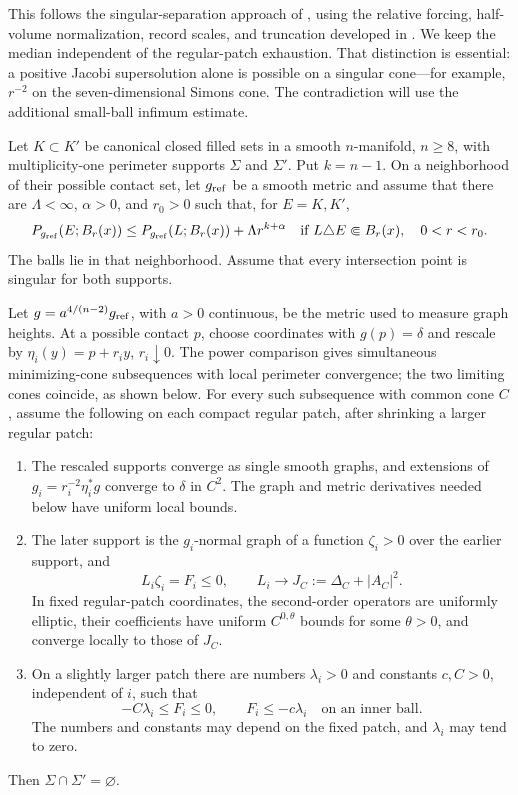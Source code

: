 This follows the singular-separation approach of
\cite[Proposition~2.36]{BiZhu2026}, using the relative forcing,
half-volume normalization, record scales, and truncation developed in
\cite[Proposition~2.34 and Lemma~2.35]{BiZhu2026v2}. We keep the
median independent of the regular-patch exhaustion. That distinction
is essential: a positive Jacobi supersolution alone is possible on a
singular cone---for example, $r^{-2}$ on the seven-dimensional Simons
cone. The contradiction will use the additional small-ball infimum
estimate.

\begin{proposition}
\label{prop:rpi:singular-separation}
Let $K\subset K'$ be canonical closed filled sets in a smooth
$n$-manifold, $n\ge8$, with multiplicity-one perimeter supports
$\Sigma$ and $\Sigma'$. Put $k=n-1$. On a neighborhood of their
possible contact set, let $g_{\rm ref}$ be a smooth metric and assume
that there are $\Lambda<\infty$, $\alpha>0$, and $r_0>0$ such that,
for $E=K,K'$,
\[
 P_{g_{\rm ref}}(E;B_r(x))
 \le P_{g_{\rm ref}}(L;B_r(x))+\Lambda r^{k+\alpha}
 \quad\text{if }L\triangle E\Subset B_r(x),\quad 0<r<r_0.
\]
The balls lie in that neighborhood. Assume that every intersection
point is singular for both supports.

Let $g=a^{4/(n-2)}g_{\rm ref}$, with $a>0$ continuous, be the
metric used to measure graph heights. At a possible contact $p$,
choose coordinates with $g(p)=\delta$ and rescale by
$\eta_i(y)=p+r_i y$, $r_i\downarrow0$. The power comparison gives
simultaneous minimizing-cone subsequences with local perimeter
convergence; the two limiting cones coincide, as shown below.
For every such subsequence with common cone $C$, assume the following
on each compact regular patch, after shrinking a larger regular patch:
\begin{enumerate}
\item The rescaled supports converge as single smooth graphs, and
      extensions of $g_i=r_i^{-2}\eta_i^*g$ converge to $\delta$
      in $C^2$. The graph and metric derivatives needed below have
      uniform local bounds.
\item The later support is the $g_i$-normal graph of a function
      $\zeta_i>0$ over the earlier support, and
\begin{equation}\label{eq:rpi:separation-interface}
 L_i\zeta_i=F_i\le0,\qquad
 L_i\longrightarrow J_C:=\Delta_C+|A_C|^2.
\end{equation}
      In fixed regular-patch coordinates, the second-order operators
      are uniformly elliptic, their coefficients have uniform
      $C^{0,\theta}$ bounds for some $\theta>0$, and converge locally
      to those of $J_C$.
\item On a slightly larger patch there are numbers $\lambda_i>0$
      and constants $c,C>0$, independent of $i$, such that
\[
 -C\lambda_i\le F_i\le0,\qquad
 F_i\le-c\lambda_i\quad\text{on an inner ball}.
\]
      The numbers and constants may depend on the fixed patch, and
      $\lambda_i$ may tend to zero.
\end{enumerate}
Then $\Sigma\cap\Sigma'=\varnothing$.
\end{proposition}

